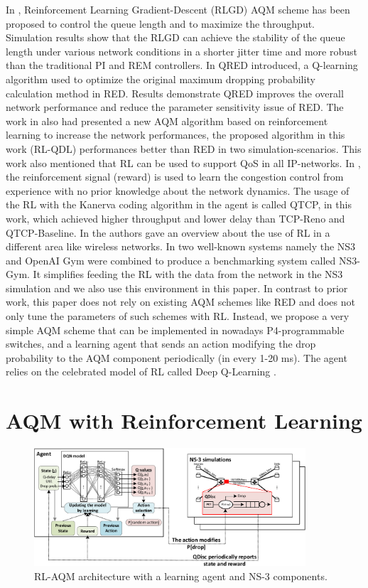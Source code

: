 \documentclass[conference]{IEEEtran}
\begin{document}
In \cite{zhang2004robust}, Reinforcement Learning Gradient-Descent (RLGD) AQM scheme has been proposed to control the queue length and to maximize the throughput. Simulation results show that the RLGD can achieve the stability of the queue length under various network conditions in a shorter jitter time and more robust than the traditional PI and REM controllers.  In \cite{su2018qred} QRED introduced, a Q-learning algorithm used to optimize the original maximum dropping probability calculation method in RED. Results demonstrate QRED improves the overall network performance and reduce the parameter sensitivity issue of RED. The work in \cite{vucevic2007reinforcement} also had presented a new AQM algorithm based on reinforcement learning to increase the network performances, the proposed algorithm in this work (RL-QDL) performances better than RED in two simulation-scenarios. This work also mentioned that RL can be used to support QoS in all IP-networks. In \cite{li2018qtcp}, the reinforcement signal (reward) is used to learn the congestion control from experience with no prior knowledge about the network dynamics. The usage of the RL with the Kanerva coding algorithm in the agent is called QTCP, in this work, which achieved higher throughput and lower delay than TCP-Reno and QTCP-Baseline. In \cite{samek2017convergence} the authors gave an overview about the use of RL in a different area like wireless networks. In \cite{gawlowicz2019ns} two well-known systems namely the NS3 and OpenAI Gym were combined to produce a benchmarking system called NS3-Gym. It simplifies feeding the RL with the data from the network in the NS3 simulation and we also use this environment in this paper.
In contrast to prior work, this paper does not rely on existing AQM schemes like RED and does not only tune the parameters of such schemes with RL. Instead, we propose a very simple AQM scheme that can be implemented in nowadays P4-programmable switches, and a learning agent that sends an action modifying the drop probability to the AQM component periodically (in every 1-20 ms). The agent relies on the celebrated model of RL called Deep Q-Learning \cite{dqnint}.

\section{AQM with Reinforcement Learning}

\begin{figure}[t]
\begin{center}
\includegraphics[width=0.9\textwidth]{Figures/rlaqm-crop.pdf}
\end{center}
\caption{RL-AQM architecture with a learning agent and NS-3 components.}
\label{fig:arch}
\end{figure}
\end{document}
